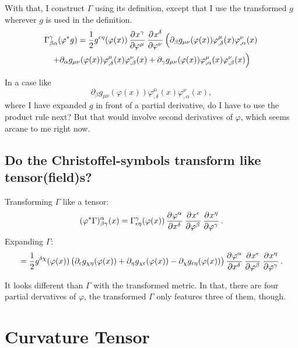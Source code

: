 With that, I construct $\Gamma$ using its definition, except that I use the
transformed $g$ wherever $g$ is used in the definition.
\begin{multline*}
    \Gamma^\gamma_{\beta\alpha}(\varphi^*g)
    = \frac 12 g^{\epsilon\eta}(\varphi(x))
    \dpd{{x^\gamma}}{{\varphi^\mu}} \dpd{{x^\delta}}{{\varphi^\nu}}
    \left(
        \partial_\beta g_{\mu\nu}(\varphi(x)) \varphi^\mu_{,\delta}(x)
        \varphi^\nu_{,\alpha}(x) 
    \right. \\
    \left.
        +
        \partial_\alpha g_{\mu\nu}(\varphi(x)) \varphi^\mu_{,\delta}(x)
        \varphi^\nu_{,\beta}(x)
        +
        \partial_\gamma g_{\mu\nu}(\varphi(x)) \varphi^\mu_{,\alpha}(x)
        \varphi^\nu_{,\beta}(x)
    \right)
\end{multline*}

\begin{aside}
    In a case like
    \[
        \partial_\beta g_{\mu\nu}(\varphi(x)) \varphi^\mu_{,\delta}(x)
        \varphi^\nu_{,\alpha}(x),
    \]
    where I have expanded $g$ in front of a partial derivative, do I have to
    use the product rule next? But that would involve second derivatives of
    $\varphi$, which seems arcane to me right now.
\end{aside}

\subsection{Do the Christoffel-symbols transform like tensor(field)s?}

Transforming $\Gamma$ like a tensor:
\[
    (\varphi^*\Gamma)^\alpha_{\beta\gamma}(x) =
    \Gamma^\gamma_{\epsilon\eta}(\varphi(x)) \dpd{{\varphi^\alpha}}{{x^\delta}}
    \dpd{{x^\epsilon}}{{\varphi^\beta}} \dpd{{x^\eta}}{{\varphi^\gamma}}.
\]
Expanding $\Gamma$:
\[
    = \frac 12 g^{\delta\chi}(\varphi(x))
    \del{
        \partial_\epsilon g_{\chi\eta}(\varphi(x)) + \partial_\eta
        g_{\chi\epsilon}(\varphi(x)) - \partial_\chi
    g_{\epsilon\eta}(\varphi(x))
    }
    \dpd{{\varphi^\alpha}}{{x^\delta}}
    \dpd{{x^\epsilon}}{{\varphi^\beta}} \dpd{{x^\eta}}{{\varphi^\gamma}}.
\]

It looks different than $\Gamma$ with the transformed metric. In that, there
are four partial dervatives of $\varphi$, the transformed $\Gamma$ only
features three of them, though.

\section{Curvature Tensor}

